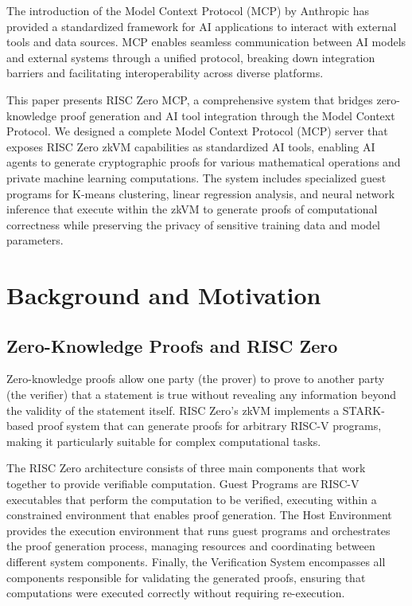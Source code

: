 \documentclass[11pt]{article}
\begin{document}
The introduction of the Model Context Protocol (MCP) by Anthropic has provided a standardized framework for AI applications to interact with external tools and data sources. MCP enables seamless communication between AI models and external systems through a unified protocol, breaking down integration barriers and facilitating interoperability across diverse platforms.

This paper presents RISC Zero MCP, a comprehensive system that bridges zero-knowledge proof generation and AI tool integration through the Model Context Protocol. We designed a complete Model Context Protocol (MCP) server that exposes RISC Zero zkVM capabilities as standardized AI tools, enabling AI agents to generate cryptographic proofs for various mathematical operations and private machine learning computations. The system includes specialized guest programs for K-means clustering, linear regression analysis, and neural network inference that execute within the zkVM to generate proofs of computational correctness while preserving the privacy of sensitive training data and model parameters.

\section{Background and Motivation}
\label{sec:background}

\subsection{Zero-Knowledge Proofs and RISC Zero}

Zero-knowledge proofs allow one party (the prover) to prove to another party (the verifier) that a statement is true without revealing any information beyond the validity of the statement itself. RISC Zero's zkVM implements a STARK-based proof system that can generate proofs for arbitrary RISC-V programs, making it particularly suitable for complex computational tasks.

The RISC Zero architecture consists of three main components that work together to provide verifiable computation. Guest Programs are RISC-V executables that perform the computation to be verified, executing within a constrained environment that enables proof generation. The Host Environment provides the execution environment that runs guest programs and orchestrates the proof generation process, managing resources and coordinating between different system components. Finally, the Verification System encompasses all components responsible for validating the generated proofs, ensuring that computations were executed correctly without requiring re-execution.
\end{document}

